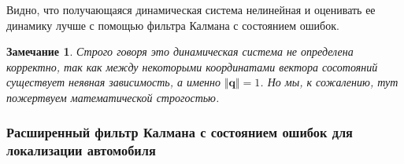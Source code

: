 \documentclass[12pt]{article}
\newtheorem{remark}[theorem]{Замечание}
\begin{document}
Видно, что получающаяся динамическая система нелинейная и оценивать ее динамику
лучше с помощью фильтра Калмана с состоянием ошибок.

\begin{remark} Строго говоря это динамическая система не определена корректно,
    так как между некоторыми координатами вектора сосотояний существует неявная
    зависимость, а именно $\Vert \pmb{q}\Vert=1$. Но мы, к сожалению, тут пожертвуем
    математической строгостью.
\end{remark}

\subsubsection{Расширенный фильтр Калмана с состоянием ошибок для локализации автомобиля}
\label{SubsubsectionErorStateKalmanFilterForLocalization}
\end{document}
